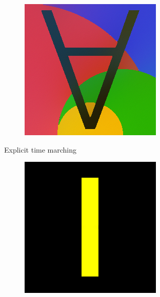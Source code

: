 \documentclass[xcolor=dvipsnames, xetex,serif]{beamer}
\begin{document}
\begin{frame}
\begin{figure}[H]
\begin{subfigure}{0.15\linewidth}
            \end{subfigure}
            \begin{subfigure}{0.15\linewidth}
                \centering
                \includegraphics[width=0.9\linewidth]{images/result_ex1/timemarch05.png}
            \end{subfigure}
            \caption{Explicit time marching}
        \end{figure}
        \begin{figure}[H]
            \centering
            \begin{subfigure}{0.15\linewidth}
                \centering
                \includegraphics[width=0.9\linewidth]{images/result_ex1/fixpoint01.png}

\end{subfigure}
\end{figure}
\end{frame}
\end{document}
